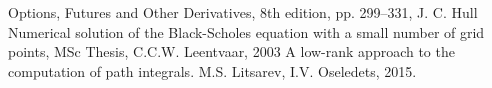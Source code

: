\documentclass[11pt,a4paper]{extarticle}
\begin{document}
\renewcommand{\refname}{References}
\begin{thebibliography}{9}
     Options, Futures and Other Derivatives, 8th edition, pp. 299--331, J. C. Hull
     Numerical solution of the Black-Scholes equation with a small number of grid points, MSc Thesis, C.C.W. Leentvaar, 2003
     A low-rank approach to the computation of path integrals. M.S. Litsarev, I.V. Oseledets, 2015.
\end{thebibliography}
\end{document}
